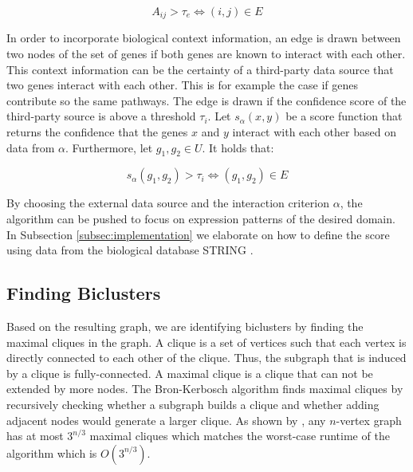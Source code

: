 \documentclass[10pt, conference, compsocconf]{IEEEtran}
\begin{document}
\begin{equation}
    A_{ij} > \tau_e \iff (i, j) \in E
\end{equation}

In order to incorporate biological context information, an edge is drawn between two nodes of the set of genes if both genes are known to interact with each other.
This context information can be the certainty of a third-party data source that two genes interact with each other.
This is for example the case if genes contribute so the same pathways.
The edge is drawn if the confidence score of the third-party source is above a threshold $\tau_i$.
Let $s_\alpha(x, y)$ be a score function that returns the confidence that the genes $x$ and $y$ interact with each other based on data from $\alpha$.
Furthermore, let $g_1, g_2 \in U$.
It holds that:

\begin{equation}
    s_\alpha(g_1, g_2) > \tau_i \iff (g_1, g_2) \in E
\end{equation}

By choosing the external data source and the interaction criterion $\alpha$, the algorithm can be pushed to focus on expression patterns of the desired domain.
In Subsection \ref{subsec:implementation} we elaborate on how to define the score using data from the biological database STRING \citep{StringDB15}.

\subsection{Finding Biclusters}
Based on the resulting graph, we are identifying biclusters by finding the maximal cliques in the graph.
A clique is a set of vertices such that each vertex is directly connected to each other of the clique.
Thus, the subgraph that is induced by a clique is fully-connected.
A maximal clique is a clique that can not be extended by more nodes.
The Bron-Kerbosch \citep{Bron73} algorithm finds maximal cliques by recursively checking whether a subgraph builds a clique and whether adding adjacent nodes would generate a larger clique.
As shown by \cite{Tomita06}, any $n$-vertex graph has at most $3^{n/3}$ maximal cliques which matches the worst-case runtime of the algorithm which is $O(3^{n/3})$.
\end{document}
